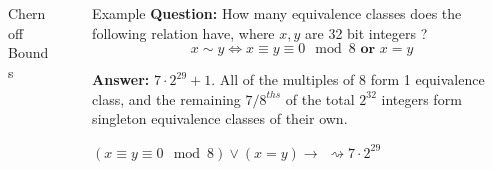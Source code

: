\documentclass[final]{beamer}
\newlength{\sepwidth}
\newlength{\colwidth}
\newcommand{\separatorcolumn}{\begin{column}{\sepwidth}\end{column}}
\begin{document}
\begin{frame}[t]
\begin{columns}[t]
\begin{column}{\colwidth}
\begin{block}{Chernoff Bounds}
  \end{block}

\end{column}

\separatorcolumn

\begin{column}{\colwidth}

  \begin{block}{Example}
    	 \textbf{Question:} How many equivalence classes does the following relation have, where $x,y$ are 32 bit integers ? 
	\begin{equation}
		x \sim y \Leftrightarrow x \equiv y \equiv 0 \mod 8 \textbf{ or } x = y
	\end{equation}
	\begin{center}
		\textbf{Answer:} $7\cdot2^{29} + 1$. All of the multiples of 8 form 1 equivalence class, and the remaining $7/8^{ths}$ of the total $2^{32}$ integers form singleton equivalence classes of their own.
	\end{center}
	\begin{center}
		$(x \equiv y \equiv 0 \mod 8) \vee (x = y) \rightarrow$   $\rightsquigarrow 7\cdot2^{29}$
	\end{center}



\end{block}
\end{column}
\end{columns}
\end{frame}
\end{document}
